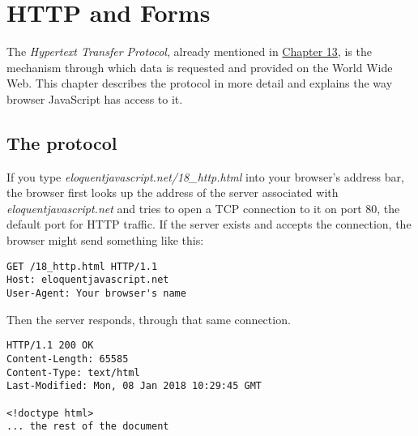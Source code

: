 \chapter{HTTP and Forms}\label{http}


The \emph{Hypertext Transfer Protocol}, already mentioned in \hyperref[browser.web]{Chapter 13}, is the mechanism through which data is requested and provided on the World Wide Web. This chapter describes the protocol in more detail and explains the way browser JavaScript has access to it.

\section{The protocol}

If you type \emph{eloquentjavascript.net\slash 18\_http.html} into your browser's address bar, the browser first looks up the address of the server associated with \emph{eloquentjavascript.net} and tries to open a TCP connection to it on port 80, the default port for HTTP traffic. If the server exists and accepts the connection, the browser might send something like this:

\begin{lstlisting}
GET /18_http.html HTTP/1.1
Host: eloquentjavascript.net
User-Agent: Your browser's name
\end{lstlisting}
\noindent

Then the server responds, through that same connection.

\begin{lstlisting}
HTTP/1.1 200 OK
Content-Length: 65585
Content-Type: text/html
Last-Modified: Mon, 08 Jan 2018 10:29:45 GMT

<!doctype html>
... the rest of the document
\end{lstlisting}
\noindent

